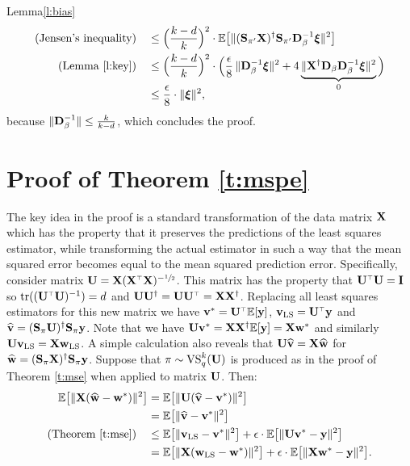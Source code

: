 \documentclass[12pt]{sty/colt2019/colt2018-arxiv}
\begin{document}
\begin{proofof}{Lemma}{\ref{l:bias}}
\begin{align*}
  \text{(Jensen's inequality)}\quad
  &\leq
    \Big(\frac{k-d}{k}\Big)^2\cdot\mathbb E\big[\|(\mathbf{S}_{\pi'}\mathbf X)^\dagger\mathbf{S}_{\pi'}\mathbf D_\beta^{-1}\boldsymbol\xi\|^2\big]\\
  \text{(Lemma \ref{l:key})}\quad
  &\leq \Big(\frac{k-d}{k}\Big)^2\cdot \Big(\frac\epsilon8\,\|\mathbf D_\beta^{-1}\boldsymbol\xi\|^2 +
    4\underbrace{\|\mathbf X^\dagger\mathbf D_\beta\mathbf D_\beta^{-1}\boldsymbol\xi\|^2}_{0}\Big)\\[-3mm]
  &\leq \frac\epsilon8\cdot\|\boldsymbol\xi\|^2,
\end{align*}
because $\|\mathbf D_\beta^{-1}\|\leq \frac{k}{k-d}$, which concludes the proof.
\end{proofof}

\section{Proof of Theorem \ref{t:mspe}}
\label{a:mspe}
  The key idea in the proof is a standard transformation of the
  data matrix $\mathbf X$ which has the property that it preserves the
  predictions of the least squares estimator, while transforming the
  actual estimator in such a way that the mean squared error becomes
  equal to the mean squared prediction error. Specifically, consider
  matrix $\U=\X(\X^\top\X)^{-\sfrac12}$. This matrix has the property
  that $\U^\top\U=\I$ so $\tr((\U^\top\U)^{-1})=d$ and $\U\U^\dagger=\U\U^\top=\X\X^\dagger$. Replacing all least squares
  estimators for this new matrix we have $\v^* = \U^\top\E[\y]$,
  $\v_{\mathrm{LS}}=\U^\top \y$ and $\widehat{\mathbf v}=(\mathbf{S}_\pi\mathbf U)^\dagger\mathbf{S}_\pi
  \mathbf y$. Note that we have $\mathbf U\mathbf v^*=\mathbf X\mathbf X^\dagger\mathbb E[\mathbf y]=\mathbf X\mathbf w^*$ and
  similarly $\mathbf U\mathbf v_{\mathrm{LS}}=\mathbf X\mathbf w_{\mathrm{LS}}$. A simple calculation also
  reveals that $\mathbf U\widehat{\mathbf v}=\mathbf X\widehat{\mathbf w}$ for
  $\widehat{\mathbf w}=(\mathbf{S}_\pi\mathbf X)^\dagger\mathbf{S}_\pi\mathbf y$.
   Suppose that $\pi\sim{\mathrm{VS}}_q^k(\mathbf U)$
  is produced as in
  the proof of Theorem \ref{t:mse} when applied 
  to matrix $\mathbf U$. Then: 
  \begin{align*}
    \mathbb E\big[\|\mathbf X(\widehat{\mathbf w}-\mathbf w^*)\|^2\big]
    &= \mathbb E\big[\|\mathbf U(\widehat{\mathbf v}-\mathbf v^*)\|^2\big]\\
&= \mathbb E\big[\|\widehat{\mathbf v}-\mathbf v^*\|^2\big]\\
    \text{(Theorem \ref{t:mse})}\quad
    &\leq \mathbb E\big[\|\mathbf v_{\mathrm{LS}}-\mathbf v^*\|^2\big] + \epsilon\cdot \mathbb E\big[\|\mathbf U\mathbf v^*-\mathbf y\|^2\big]\\
      &= \mathbb E\big[\|\mathbf X(\mathbf w_{\mathrm{LS}}-\mathbf w^*)\|^2\big] + \epsilon\cdot \mathbb E\big[\|\mathbf X\mathbf w^*-\mathbf y\|^2\big].
  \end{align*}
\end{document}
